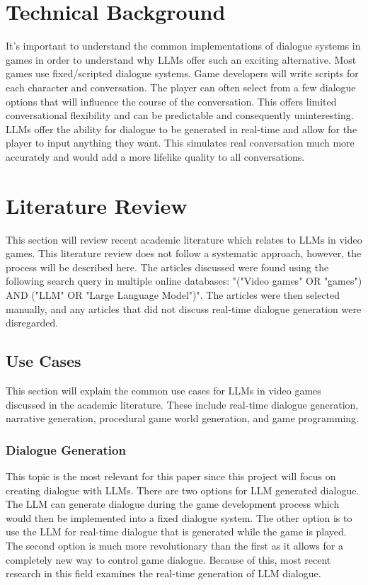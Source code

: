 \documentclass[10pt,twocolumn]{article}
\begin{document}
\section{Technical Background}
It's important to understand the common implementations of dialogue systems in games in order to understand why LLMs offer such an exciting alternative. Most games use fixed/scripted dialogue systems. Game developers will write scripts for each character and conversation. The player can often select from a few dialogue options that will influence the course of the conversation. This offers limited conversational flexibility and can be predictable and consequently uninteresting. LLMs offer the ability for dialogue to be generated in real-time and allow for the player to input anything they want. This simulates real conversation much more accurately and would add a more lifelike quality to all conversations. 

\section{Literature Review}
This section will review recent academic literature which relates to LLMs in video games. This literature review does not follow a systematic approach, however, the process will be described here. The articles discussed were found using the following search query in multiple online databases: "("Video games" OR "games") AND ("LLM" OR "Large Language Model")". The articles were then selected manually, and any articles that did not discuss real-time dialogue generation were disregarded. 

\subsection{Use Cases}
This section will explain the common use cases for LLMs in video games discussed in the academic literature. These include real-time dialogue generation, narrative generation, procedural game world generation, and game programming.

\subsubsection{Dialogue Generation}
This topic is the most relevant for this paper since this project will focus on creating dialogue with LLMs. There are two options for LLM generated dialogue. The LLM can generate dialogue during the game development process which would then be implemented into a fixed dialogue system. The other option is to use the LLM for real-time dialogue that is generated while the game is played. The second option is much more revolutionary than the first as it allows for a completely new way to control game dialogue. Because of this, most recent research in this field examines the real-time generation of LLM dialogue.
\end{document}
